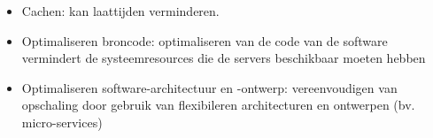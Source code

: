 \begin{itemize}
    \item Cachen: kan laattijden verminderen.

    \item Optimaliseren broncode: optimaliseren van de code van de software
    vermindert de systeemresources die de servers beschikbaar moeten hebben

    \item Optimaliseren software-architectuur en -ontwerp: vereenvoudigen van
    opschaling door gebruik van flexibileren architecturen en ontwerpen 
    (bv. micro-services)

\end{itemize}



